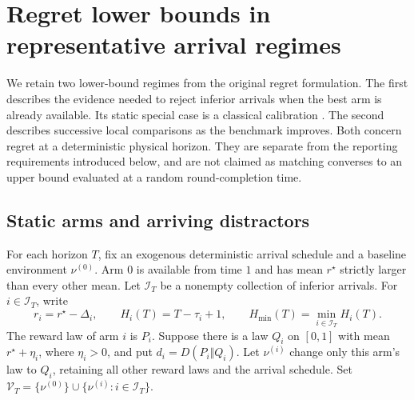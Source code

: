 \section{Regret lower bounds in representative arrival regimes}
\label{sec:retained_regret_lower_bounds}

We retain two lower-bound regimes from the original regret formulation.
The first describes the evidence needed to reject inferior arrivals when
the best arm is already available. Its static special case is a classical
calibration \citep{LAI19854,BurnetasKatehakis1996}. The second describes
successive local comparisons as the benchmark improves. Both concern regret
at a deterministic physical horizon. They are separate from the reporting
requirements introduced below, and are not claimed as matching converses to
an upper bound evaluated at a random round-completion time.

\subsection{Static arms and arriving distractors}

For each horizon $T$, fix an exogenous deterministic arrival schedule and a
baseline environment $\nu^{(0)}$. Arm $0$ is available from time $1$ and has
mean $r^\star$ strictly larger than every other mean. Let $\mathcal I_T$ be
a nonempty collection of inferior arrivals. For $i\in\mathcal I_T$, write
\[
 r_i=r^\star-\Delta_i,\qquad
 H_i(T)=T-\tau_i+1,\qquad
 H_{\min}(T)=\min_{i\in\mathcal I_T}H_i(T).
\]
The reward law of arm $i$ is $P_i$. Suppose there is a law $Q_i$ on $[0,1]$
with mean $r^\star+\eta_i$, where $\eta_i>0$, and put
$d_i=D(P_i\Vert Q_i)$. Let $\nu^{(i)}$ change only this arm's law to $Q_i$,
retaining all other reward laws and the arrival schedule. Set
$\mathcal V_T=\{\nu^{(0)}\}\cup\{\nu^{(i)}:i\in\mathcal I_T\}$.

